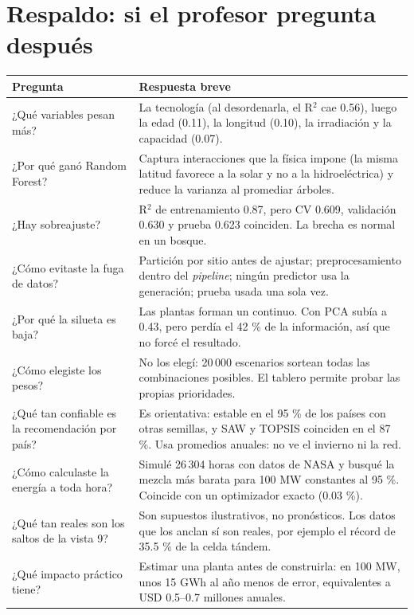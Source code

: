 \documentclass[10.5pt,letterpaper]{article}
\begin{document}
\section*{Respaldo: si el profesor pregunta después}
\small
\begin{tabularx}{\linewidth}{@{}>{\raggedright\arraybackslash}p{5.3cm}X@{}}
\toprule
Pregunta & Respuesta breve \\
\midrule
¿Qué variables pesan más? & La tecnología (al desordenarla, el R$^2$ cae 0.56), luego la edad (0.11), la longitud (0.10), la irradiación y la capacidad (0.07). \\
¿Por qué ganó Random Forest? & Captura interacciones que la física impone (la misma latitud favorece a la solar y no a la hidroeléctrica) y reduce la varianza al promediar árboles. \\
¿Hay sobreajuste? & R$^2$ de entrenamiento 0.87, pero CV 0.609, validación 0.630 y prueba 0.623 coinciden. La brecha es normal en un bosque. \\
¿Cómo evitaste la fuga de datos? & Partición por sitio antes de ajustar; preprocesamiento dentro del \textit{pipeline}; ningún predictor usa la generación; prueba usada una sola vez. \\
¿Por qué la silueta es baja? & Las plantas forman un continuo. Con PCA subía a 0.43, pero perdía el 42 \% de la información, así que no forcé el resultado. \\
¿Cómo elegiste los pesos? & No los elegí: 20\,000 escenarios sortean todas las combinaciones posibles. El tablero permite probar las propias prioridades. \\
¿Qué tan confiable es la recomendación por país? & Es orientativa: estable en el 95 \% de los países con otras semillas, y SAW y TOPSIS coinciden en el 87 \%. Usa promedios anuales: no ve el invierno ni la red. \\
¿Cómo calculaste la energía a toda hora? & Simulé 26\,304 horas con datos de NASA y busqué la mezcla más barata para 100 MW constantes al 95 \%. Coincide con un optimizador exacto (0.03 \%). \\
¿Qué tan reales son los saltos de la vista 9? & Son supuestos ilustrativos, no pronósticos. Los datos que los anclan sí son reales, por ejemplo el récord de 35.5 \% de la celda tándem. \\
¿Qué impacto práctico tiene? & Estimar una planta antes de construirla: en 100 MW, unos 15 GWh al año menos de error, equivalentes a USD 0.5--0.7 millones anuales. \\
\bottomrule
\end{tabularx}
\end{document}
